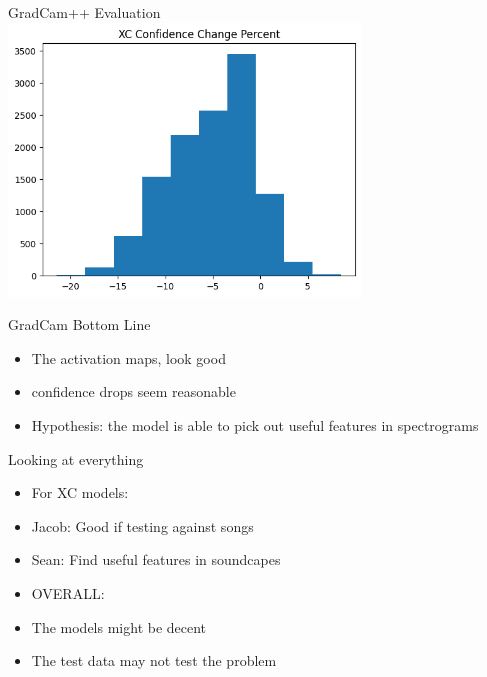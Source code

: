 \begin{frame}{GradCam++ Evaluation}
    \centering
    \includegraphics[height=0.7\textheight,width=0.7\textwidth,keepaspectratio]{./images/XC_conf.png}
\end{frame}
\begin{frame}{GradCam Bottom Line}
    \begin{itemize}
        \item The activation maps, look good
        \item confidence drops seem reasonable
        \item Hypothesis: the model is able to pick out useful features in spectrograms
    \end{itemize}
\end{frame}


\begin{frame}{Looking at everything}
    \begin{itemize}
        \item For XC models:
        \item Jacob: Good if testing against songs
        \item Sean: Find useful features in soundcapes
        \item OVERALL:
        \item The models might be decent
        \item The test data may not test the problem
    \end{itemize}
\end{frame}






